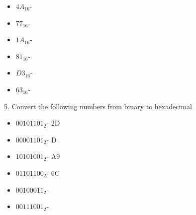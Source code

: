 \documentclass[a4paper,12pt]{article}
\begin{document}
\begin{itemize}
\item $4A_{16}$\quad - 
\item $77_{16}$\quad - 
\item $1A_{16}$\quad - 
\item $81_{16}$\quad - 
\item $D3_{16}$\quad - 
\item $63_{16}$\quad - 
\end{itemize}
5. Convert the following numbers from binary to hexadecimal 
\begin{itemize}
\item $00101101_{2}$\quad - \quad 2D
\item $00001101_{2}$\quad - \quad D
\item $10101001_{2}$\quad - \quad A9
\item $01101100_{2}$\quad - \quad 6C
\item $00100011_{2}$\quad - 
\item $00111001_{2}$\quad - 
\end{itemize}\newpage
\end{document}
